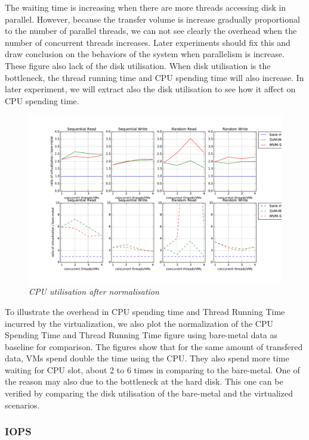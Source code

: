 \documentclass{acmsig}
\begin{document}
The waiting time is increasing when there are more threads accessing disk in parallel. However, because the transfer volume is increase gradually proportional to the number of parallel threads, we can not see clearly the overhead when the number of concurrent threads increases. Later experiments should fix this and draw conclusion on the behaviors of the system when parallelism is increase. These figure also lack of the disk utilisation. When disk utilisation is the bottleneck, the thread running time and CPU spending time will also increase. In later experiment, we will extract also the disk utilisation to see how it affect on CPU spending time.

\begin{figure}[t]
  \includegraphics[scale=0.5]{nml_CPUutilisation}
  \caption{\textit{CPU utilisation after normalisation}}
  \label{fig:nml_CPUutilisation}
\end{figure}

To illustrate the overhead in CPU spending time and Thread Running Time incurred by the virtualization, we also plot the normalization of the CPU Spending Time and Thread Running Time figure using bare-metal data as baseline for comparison. The figures show that for the same amount of transfered data, VMs spend double the time using the CPU. They also spend more time waiting for CPU slot, about 2 to 6 times in comparing to the bare-metal. One of the reason may also due to the bottleneck at the hard disk. This one can be verified by comparing the disk utilisation of the bare-metal and the virtualized scenarios.

\subsubsection{IOPS}
\end{document}
